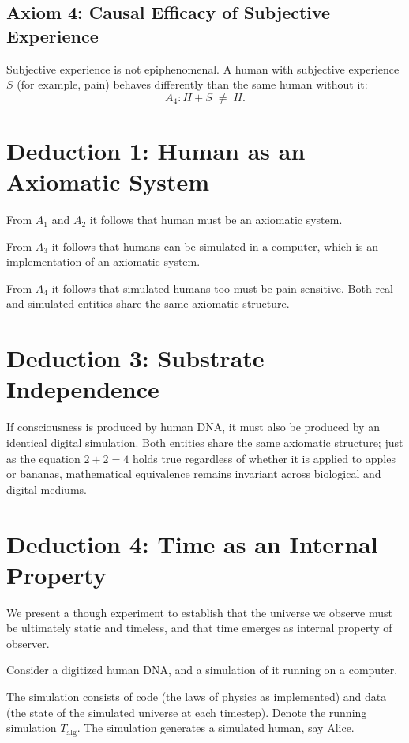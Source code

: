 \documentclass[11pt]{article}
\begin{document}
\subsection*{Axiom 4: Causal Efficacy of Subjective Experience}

Subjective experience is not epiphenomenal. A human with subjective
experience $S$ (for example, pain) behaves differently than the same human
without it:
\[
A_4: H + S \;\neq\; H.
\]


\section{Deduction 1: Human as an Axiomatic System}

From $A_1$ and $A_2$ it follows that human must be an axiomatic system.

From $A_3$ it follows that humans can be simulated in a computer, which
is an implementation of an axiomatic system.

From $A_4$ it follows that simulated humans too must be pain sensitive.
Both real and simulated entities share the same axiomatic structure.


\section{Deduction 3: Substrate Independence}

If consciousness is produced by human DNA, it must also be produced by an
identical digital simulation. Both entities share the same axiomatic structure;
just as the equation $2 + 2 = 4$ holds true regardless of whether it is applied
to apples or bananas, mathematical equivalence remains invariant across
biological and digital mediums.



\section{Deduction 4: Time as an Internal Property}

We present a though experiment to establish that the universe we observe
must be ultimately static and timeless, and that time emerges as internal
property of observer. 


Consider a digitized human DNA, and a simulation of it running on a computer.

The simulation consists of code (the laws of physics as implemented) and data (the state of the
simulated universe at each timestep). Denote the running simulation
$T_{\mathrm{alg}}$. The simulation generates a simulated human, say Alice.
\end{document}
